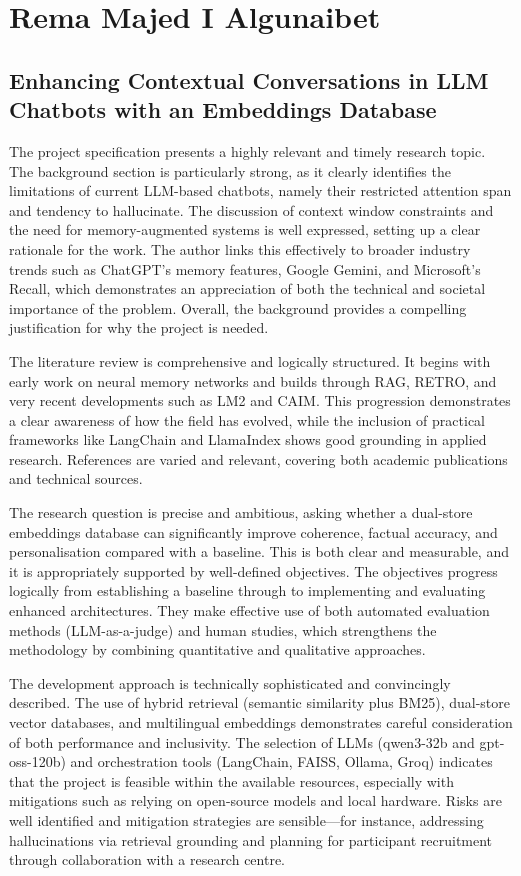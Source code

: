 \documentclass{report}
\begin{document}
\section{Rema Majed I Algunaibet}
\subsection{Enhancing Contextual Conversations in LLM Chatbots with an Embeddings Database}
The project specification presents a highly relevant and timely research topic. The background section is particularly strong, as it clearly identifies the limitations of current LLM-based chatbots, namely their restricted attention span and tendency to hallucinate. The discussion of context window constraints and the need for memory-augmented systems is well expressed, setting up a clear rationale for the work. The author links this effectively to broader industry trends such as ChatGPT’s memory features, Google Gemini, and Microsoft’s Recall, which demonstrates an appreciation of both the technical and societal importance of the problem. Overall, the background provides a compelling justification for why the project is needed.

The literature review is comprehensive and logically structured. It begins with early work on neural memory networks and builds through RAG, RETRO, and very recent developments such as LM2 and CAIM. This progression demonstrates a clear awareness of how the field has evolved, while the inclusion of practical frameworks like LangChain and LlamaIndex shows good grounding in applied research. References are varied and relevant, covering both academic publications and technical sources. 

The research question is precise and ambitious, asking whether a dual-store embeddings database can significantly improve coherence, factual accuracy, and personalisation compared with a baseline. This is both clear and measurable, and it is appropriately supported by well-defined objectives. The objectives progress logically from establishing a baseline through to implementing and evaluating enhanced architectures. They make effective use of both automated evaluation methods (LLM-as-a-judge) and human studies, which strengthens the methodology by combining quantitative and qualitative approaches.

The development approach is technically sophisticated and convincingly described. The use of hybrid retrieval (semantic similarity plus BM25), dual-store vector databases, and multilingual embeddings demonstrates careful consideration of both performance and inclusivity. The selection of LLMs (qwen3-32b and gpt-oss-120b) and orchestration tools (LangChain, FAISS, Ollama, Groq) indicates that the project is feasible within the available resources, especially with mitigations such as relying on open-source models and local hardware. Risks are well identified and mitigation strategies are sensible—for instance, addressing hallucinations via retrieval grounding and planning for participant recruitment through collaboration with a research centre.
\end{document}
